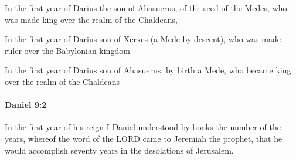 			\begin{versebox}
					\item[BHS] 
					\item[LXX] 
					\item[ASV] In the first year of Darius the son of Ahasuerus, of the seed of the Medes, who was made king over the realm of the Chaldeans,
					\item[NIV] In the first year of Darius son of Xerxes (a Mede by descent), who was made ruler over the Babylonian kingdom—
					\item[NRSV] In the first year of Darius son of Ahasuerus, by birth a Mede, who became king over the realm of the Chaldeans—
			\end{versebox}

		\paragraph{Daniel 9:2} %
			\label{DANIEL-9-2}

			In the first year of his reign I Daniel understood by books the number of the years, whereof the word of the LORD came to Jeremiah the prophet, that he would accomplish seventy years in the desolations of Jerusalem.

